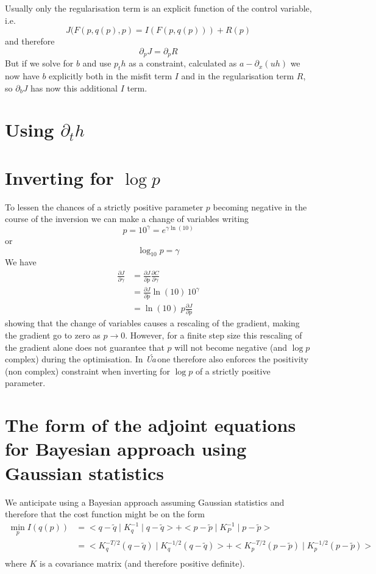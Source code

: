 \documentclass[10pt,a4paper]{book}
\newcommand{\p}{\partial}
\newcommand{\Ua}{\textsl{\'Ua}\,}
\begin{document}
Usually only the regularisation term is an explicit function of the
control variable, i.e.
\[
 J(F(p,q(p),p)=I(F(p,q(p)))+R(p)
\]
and therefore
\[
  \p_p J=  \p_p R 
\]
But if we solve for $b$ and use $p_t h$ as a constraint, calculated as
$a-\p_x (uh)$ we now have $b$ explicitly both in the misfit term $I$
and in the regularisation term $R$, so $\p_b J$ has now this
additional $I$ term.


\section{Using $\p_t h$}

\section{Inverting for $\log p$}
To lessen the chances of a strictly positive parameter $p$ becoming
negative in the course of the inversion we can make a change of
variables writing
\[
 p= 10^{\gamma} = e^{\gamma \ln(10)}
\]
or
\[
\log_{10} p =\gamma
\]
We have
\begin{align*}
 \frac{\p J}{\p \gamma} & = \frac{\p J}{\p p}  \frac{\p C}{\p \gamma} \\
                        & = \frac{\p J}{\p p}  \ln(10)  \, 10^{\gamma} \\
                        & = \ln(10) \; p \frac{\p J}{\p p}
\end{align*}
showing that the change of variables causes a rescaling of the
gradient, making the gradient go to zero as $p \to 0$. However, for a
finite step size this rescaling of the gradient alone does not
guarantee that $p$ will not become negative (and $\log p$ complex) during
the optimisation. In \Ua one therefore also enforces the positivity
(non complex) constraint when inverting for $\log p$ of a strictly
positive parameter.



\section{The form of the adjoint equations for Bayesian approach using Gaussian statistics}

We anticipate using a Bayesian approach assuming Gaussian statistics
and therefore that the cost function might be on the form
\begin{align*}
  \min_{p} I(q(p))
  &= < q -\tilde{q} \mid K_q^{-1} \mid q -\tilde{q} > + < p -\tilde{p} \mid K_P^{-1} \mid p -\tilde{p} >  \\
  &= < K_q^{-T/2}  (q -\tilde{q}) \mid K_q^{-1/2} ( q -\tilde{q} )> + < K_p^{-T/2}  (p -\tilde{p}) \mid K_p^{-1/2} ( p -\tilde{p} )>\\
\end{align*}
where $K$ is a covariance matrix (and therefore positive definite).
\end{document}
